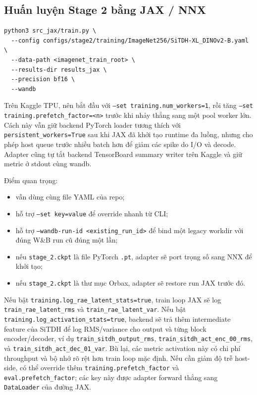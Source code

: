 \subsection{Huấn luyện Stage 2 bằng JAX / NNX}

\begin{lstlisting}[style=rae]
python3 src_jax/train.py \
  --config configs/stage2/training/ImageNet256/SiTDH-XL_DINOv2-B.yaml \
  --data-path <imagenet_train_root> \
  --results-dir results_jax \
  --precision bf16 \
  --wandb
\end{lstlisting}

Trên Kaggle TPU, nên bắt đầu với \texttt{--set training.num\_workers=1}, rồi
tăng \texttt{--set training.prefetch\_factor=<n>} trước khi nhảy thẳng sang một
pool worker lớn. Cách này vẫn giữ backend PyTorch loader tương thích với
\texttt{persistent\_workers=True} sau khi JAX đã khởi tạo runtime đa luồng,
nhưng cho phép host queue trước nhiều batch hơn để giảm các spike do I/O và
decode. Adapter cũng tự tắt backend TensorBoard summary writer trên Kaggle và
giữ metric ở stdout cùng wandb.

Điểm quan trọng:

\begin{itemize}[leftmargin=1.5em]
  \item vẫn dùng cùng file YAML của repo;
  \item hỗ trợ \texttt{--set key=value} để override nhanh từ CLI;
  \item hỗ trợ \texttt{--wandb-run-id <existing\_run\_id>} để bind một
  legacy workdir với đúng W\&B run cũ đúng một lần;
  \item nếu \texttt{stage\_2.ckpt} là file PyTorch \texttt{.pt}, adapter sẽ port
  trọng số sang NNX để khởi tạo;
  \item nếu \texttt{stage\_2.ckpt} là thư mục Orbax, adapter sẽ restore run JAX
  trước đó.
\end{itemize}

Nếu bật \texttt{training.log\_rae\_latent\_stats=true}, train loop JAX sẽ log
\texttt{train\_rae\_latent\_rms} và \texttt{train\_rae\_latent\_var}. Nếu bật
\texttt{training.log\_activation\_stats=true}, backend sẽ trả thêm intermediate
feature của SiTDH để log RMS/variance cho output và từng block encoder/decoder,
ví dụ \texttt{train\_sitdh\_output\_rms},
\texttt{train\_sitdh\_act\_enc\_00\_rms}, và
\texttt{train\_sitdh\_act\_dec\_01\_var}. Bù lại, các metric activation này có
chi phí throughput và bộ nhớ rõ rệt hơn train loop mặc định.
Nếu cần giảm độ trễ host-side, có thể override thêm
\texttt{training.prefetch\_factor} và \texttt{eval.prefetch\_factor}; các key
này được adapter forward thẳng sang \texttt{DataLoader} của đường JAX.

